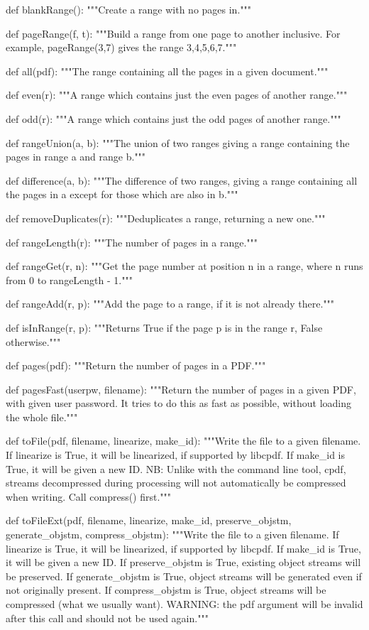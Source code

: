 def blankRange():
    """Create a range with no pages in."""

def pageRange(f, t):
    """Build a range from one page to another inclusive. For example,
    pageRange(3,7) gives the range 3,4,5,6,7."""

def all(pdf):
    """The range containing all the pages in a given document."""

def even(r):
    """A range which contains just the even pages of another range."""

def odd(r):
    """A range which contains just the odd pages of another range."""

def rangeUnion(a, b):
    """The union of two ranges giving a range containing
    the pages in range a and range b."""

def difference(a, b):
    """The difference of two ranges, giving a range
    containing all the pages in a except for those which are also in b."""

def removeDuplicates(r):
    """Deduplicates a range, returning a new one."""

def rangeLength(r):
    """The number of pages in a range."""

def rangeGet(r, n):
    """Get the page number at position n in a range, where
    n runs from 0 to rangeLength - 1."""

def rangeAdd(r, p):
    """Add the page to a range, if it is not already
    there."""

def isInRange(r, p):
    """Returns True if the page p is in the range r, False otherwise."""

def pages(pdf):
    """Return the number of pages in a PDF."""

def pagesFast(userpw, filename):
    """Return the number of pages in a given PDF, with given user password. It
    tries to do this as fast as possible, without loading the whole file."""

def toFile(pdf, filename, linearize, make_id):
    """Write the file to a given filename. If linearize is True, it will be
    linearized, if supported by libcpdf. If make_id is True, it will be given a
    new ID. NB: Unlike with the command line tool, cpdf, streams decompressed
    during processing will not automatically be compressed when writing. Call
    compress() first."""

def toFileExt(pdf, filename, linearize, make_id, preserve_objstm,
              generate_objstm, compress_objstm):
    """Write the file to a given filename. If linearize is True, it will be
    linearized, if supported by libcpdf. If make_id is True, it will be given a
    new ID.  If preserve_objstm is True, existing object streams will be
    preserved. If generate_objstm is True, object streams will be generated
    even if not originally present. If compress_objstm is True, object streams
    will be compressed (what we usually want). WARNING: the pdf argument will
    be invalid after this call and should not be used again."""

